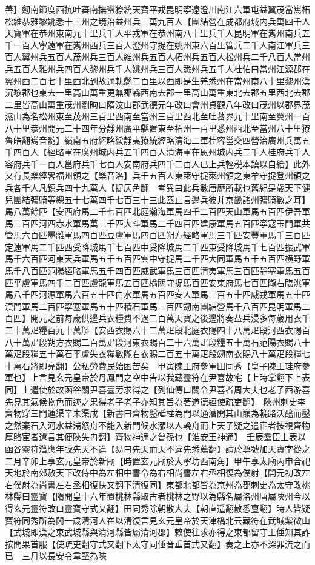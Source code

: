 善】劒南節度西抗吐蕃南撫蠻獠統天寶平戎昆明寜遠澄川南江六軍屯益翼茂當嶲柘松維恭雅黎姚悉十三州之境治益州兵三萬九百人【團結營在成都府城内兵萬四千人天寶軍在恭州東南九十里兵千人平戎軍在恭州南八十里兵千人昆明軍在嶲州南兵五千一百人寜遠軍在嶲州西兵三百人澄州守捉在姚州東六百里管兵二千人南江軍兵三百人翼州兵五百人茂州兵三百人維州兵五百人柘州兵五百人松州兵二千八百人當州兵五百人雅州兵四百人黎州兵千人姚州兵三百人悉州兵五千人杜佑曰當州江源郡在翼州西二百七十里西北到故通軌縣二百里以西即是生羌悉州在當州南八十里黎州漢沉黎郡也東去一里高山萬重更無郡縣西南去郡一里高山萬重東北去郡五里西北去郡二里皆高山萬重茂州劉昫曰隋汶山郡武德元年改曰會州貞觀八年改曰茂州以郡界茂濕山為名松州東至茂州三百里西南至當州三百里西北至吐蕃界九十里南至翼州一百八十里恭州開元二十四年分靜州廣平縣置東至柘州一百里悉州西北至當州八十里獠魯皓翻嶲音髄】嶺南五府經略綏靜夷獠統經略清海二軍桂容邕交四營治廣州兵萬五千四百人【經略軍在廣州城内兵五千四百人清海軍在恩州城内兵二千人桂府兵千人容府兵千一百人邕府兵千七百人安南府兵四千二百人已上兵輕税本鎮以自給】此外又有長樂經畧福州領之【樂音洛】兵千五百人東萊守捉萊州領之東牟守捉登州領之兵各千人凡鎮兵四十九萬人【捉仄角翻　考異曰此兵數唐歷所載也舊紀是歲天下健兒團結彍騎等總五十七萬四千七百三十三此蓋止言邊兵彼并京畿諸州彍騎數之耳】馬八萬餘匹【安西府馬二千七百匹北庭瀚海軍馬四千二百匹天山軍馬五百匹伊吾軍馬三百匹河西赤水軍馬萬三千匹大斗軍馬二千四百匹建康軍馬五百匹寜寇玉門軍共管馬六百匹墨離軍馬四百匹豆盧軍馬四百匹朔方經略軍馬三千匹安豐軍馬千三百匹定遠軍馬二千匹西受降城馬千七百匹中受降城馬二千匹東受降城馬千七百匹振武軍馬千六百匹河東天兵軍馬五千五百匹雲中守捉馬二千匹大同軍馬五千五百匹横野軍馬千八百匹范陽經略軍馬五千四百匹威武軍馬三百匹清夷軍馬三百匹靜塞軍馬五百匹平盧軍馬四千二百匹盧龍軍馬五百匹榆關守捉馬百匹安東府馬七百匹隴右臨洮軍馬八千匹河源軍馬六百五十匹白水軍馬五百匹安人軍馬三百五十匹威戎軍馬五十匹漠門軍馬二百匹寜塞軍馬五十匹積石軍馬三百匹劒南團結營馬千八百匹昆明軍馬二百匹】開元之前每歲供邊兵衣糧費不過二百萬天寶之後邊將奏益兵浸多每歲用衣千二十萬疋糧百九十萬斛【安西衣賜六十二萬疋段北庭衣賜四十八萬疋段河西衣賜百八十萬疋段朔方衣賜二百萬疋段河東衣賜百二十六萬疋段糧五十萬石范陽衣賜八十萬疋段糧五十萬石平盧失衣糧數隴右衣賜二百五十萬疋段劒南衣賜八十萬疋段糧七十萬石將即亮翻】公私勞費民始困苦矣　甲寅陳王府參軍田同秀【皇子陳王珪府參軍也】上言見玄元皇帝於丹鳳門之空中告以我藏靈符在尹喜故宅【上時掌翻下上表同】上遣使於故函谷關尹喜臺旁求得之【列仙傳曰關令尹喜者周大夫也老子西游喜先見其氣候物色而迹之果得老子老子亦知其旨為著道德經使疏吏翻】　陜州刺史李齊物穿三門運渠辛未渠成【新書曰齊物鑿砥柱為門以通漕開其山巔為輓路沃醯而鑿之然棄石入河水益湍怒舟不能入新門候水漲以人輓舟而上天子疑之遣宦者按視齊物厚賂宦者還言其便陜失冉翻】齊物神通之曾孫也【淮安王神通】　壬辰羣臣上表以函谷靈符濳應年號先天不違【易曰先天而天不違先悉薦翻】請於尊號加天寶字從之二月辛卯上享玄元皇帝於新廟【時置玄元廟於大寜坊西南角】甲午享太廟丙申合祀天地於南郊赦天下改侍中為左相中書令為右相尚書左右丞相復為僕射【開元初改左右僕射為尚書左右丞相復扶又翻下清復同】東都北都皆為京州為郡刺史為太守改桃林縣曰靈寶【隋開皇十六年置桃林縣取古者桃林之野以為縣名屬洛州唐屬陜州今以得玄元靈符改曰靈寶守式又翻】田同秀除朝散大夫【朝直遥翻散悉亶翻】時人皆疑寶符同秀所為閒一歲清河人崔以清復言見玄元皇帝於天津橋北云藏符在武城紫微山【武城即漢之東武城縣與清河縣皆屬清河郡】敕使往求亦得之東都留守王倕知其詐按問果首服【使疏吏翻守式又翻下太守同倕音垂首式又翻】奏之上亦不深罪流之而已　三月以長安令韋堅為陜